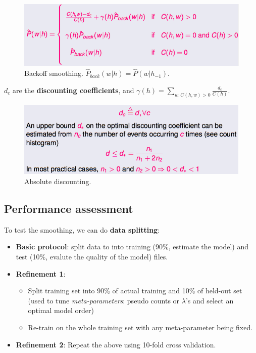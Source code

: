\begin{figure}[H]
	\centering
	\includegraphics[scale=0.5]{images/18_backoff.png}
 	\caption{Backoff smoothing. $\hat{P}_{back}(w|h) = \hat{P}(w|h_{-1})$.}
\end{figure}

$d_c$ are the \textbf{discounting coefficients}, and $\gamma(h) = \sum_{w:C(h,w)>0} \frac{d_c}{C(h)}$.

\begin{figure}[htp]
	\centering
	\includegraphics[scale=0.5]{images/19_discounting.png}
 	\caption{Absolute discounting.}
\end{figure}

\subsection{Performance assessment}

To test the smoothing, we can do \textbf{data splitting}:

\begin{itemize}
	\item \textbf{Basic protocol}: split data to into training (90\%, estimate the model) and test (10\%, evalute the quality of the model) files.
	\item \textbf{Refinement 1}:
	\begin{itemize}
		\item Split training set into 90\% of actual training and 10\% of held-out set (used to tune \textit{meta-parameters}: pseudo counts or $\lambda$'s and select an optimal model order)
		\item Re-train on the whole training set with any meta-parameter being fixed.
	\end{itemize}
	\item \textbf{Refinement 2}: Repeat the above using 10-fold cross validation. 
\end{itemize}

